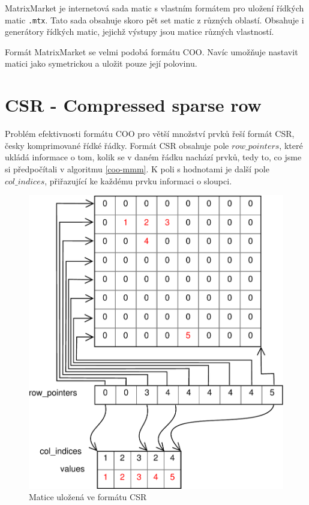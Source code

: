 MatrixMarket \cite{Boisvert:1997:MMW:265834.265854} je internetová sada matic s vlastním formátem pro uložení řídkých matic \texttt{.mtx}. Tato sada obsahuje skoro pět set matic z různých oblastí. Obsahuje i generátory řídkých matic, jejichž výstupy jsou matice různých vlastností.

Formát MatrixMarket se velmi podobá formátu COO. Navíc umožňuje nastavit matici jako symetrickou a uložit pouze její polovinu.

\section{CSR - Compressed sparse row}

Problém efektivnosti formátu COO pro větší množství prvků řeší formát CSR, česky komprimované řídké řádky. Formát CSR obsahuje pole $row\_pointers$, které ukládá informace o tom, kolik se v daném řádku nachází prvků, tedy to, co jsme si předpočítali v algoritmu \ref{coo-mmm}. K poli s hodnotami je další pole $col\_indices$, přiřazující ke každému prvku informaci o sloupci.

\begin{figure}[htb]\centering
	\includegraphics[width=\textwidth]{./images/csr/csr}
	\caption{Matice uložená ve formátu CSR}
	\label{fig:CSR}
\end{figure}

